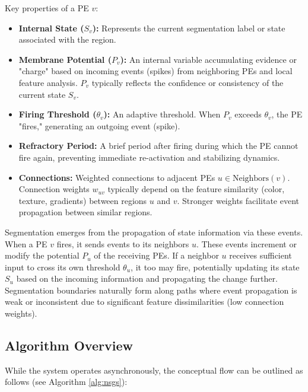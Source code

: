 \documentclass[conference]{IEEEtran}
\begin{document}
Key properties of a PE \(v\):
\begin{itemize}
    \item \textbf{Internal State (\(S_v\)):} Represents the current segmentation label or state associated with the region.
    \item \textbf{Membrane Potential (\(P_v\)):} An internal variable accumulating evidence or "charge" based on incoming events (spikes) from neighboring PEs and local feature analysis. \(P_v\) typically reflects the confidence or consistency of the current state \(S_v\).
    \item \textbf{Firing Threshold (\(\theta_v\)):} An adaptive threshold. When \(P_v\) exceeds \(\theta_v\), the PE "fires," generating an outgoing event (spike).
    \item \textbf{Refractory Period:} A brief period after firing during which the PE cannot fire again, preventing immediate re-activation and stabilizing dynamics.
    \item \textbf{Connections:} Weighted connections to adjacent PEs \(u \in \text{Neighbors}(v)\). Connection weights \(w_{uv}\) typically depend on the feature similarity (color, texture, gradients) between regions \(u\) and \(v\). Stronger weights facilitate event propagation between similar regions.
\end{itemize}

Segmentation emerges from the propagation of state information via these events. When a PE \(v\) fires, it sends events to its neighbors \(u\). These events increment or modify the potential \(P_u\) of the receiving PEs. If a neighbor \(u\) receives sufficient input to cross its own threshold \(\theta_u\), it too may fire, potentially updating its state \(S_u\) based on the incoming information and propagating the change further. Segmentation boundaries naturally form along paths where event propagation is weak or inconsistent due to significant feature dissimilarities (low connection weights).

\subsection{Algorithm Overview}

While the system operates asynchronously, the conceptual flow can be outlined as follows (see Algorithm \ref{alg:nsgs}):
\end{document}
